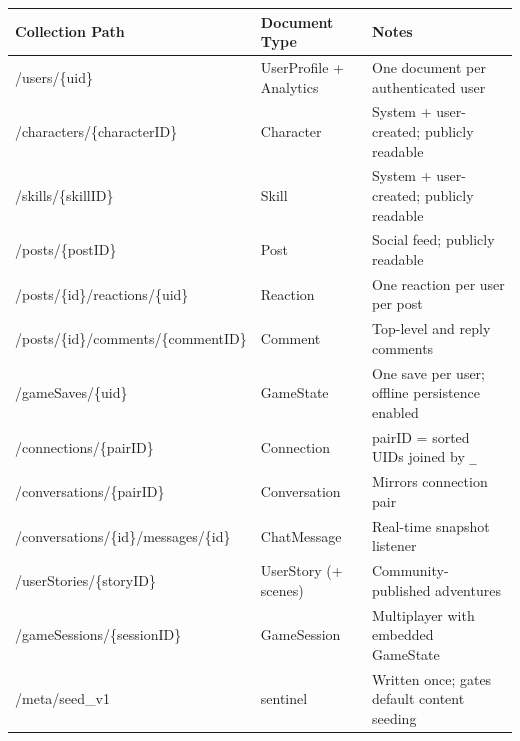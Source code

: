\documentclass[12pt,a4paper]{article}
\begin{document}
\begin{center}
\footnotesize
\begin{tabular}{>{\ttfamily\raggedright}p{5cm} >{\raggedright}p{3.8cm} >{\raggedright\arraybackslash}p{5.5cm}}
  \toprule
  \textbf{Collection Path} & \textbf{Document Type} & \textbf{Notes} \\
  \midrule
  /users/\{uid\}                         & UserProfile + Analytics     & One document per authenticated user \\
  /characters/\{characterID\}            & Character                   & System + user-created; publicly readable \\
  /skills/\{skillID\}                    & Skill                       & System + user-created; publicly readable \\
  /posts/\{postID\}                      & Post                        & Social feed; publicly readable \\
  /posts/\{id\}/reactions/\{uid\}        & Reaction                    & One reaction per user per post \\
  /posts/\{id\}/\allowbreak comments/\{commentID\}   & Comment                     & Top-level and reply comments \\
  /gameSaves/\{uid\}                     & GameState                   & One save per user; offline persistence enabled \\
  /connections/\{pairID\}                & Connection                  & pairID = sorted UIDs joined by \texttt{\_} \\
  /conversations/\{pairID\}              & Conversation                & Mirrors connection pair \\
  /conversations/\{id\}/\allowbreak messages/\{id\}  & ChatMessage                 & Real-time snapshot listener \\
  /userStories/\{storyID\}               & UserStory (+ scenes)        & Community-published adventures \\
  /gameSessions/\{sessionID\}            & GameSession                 & Multiplayer with embedded GameState \\
  /meta/seed\_v1                         & sentinel                    & Written once; gates default content seeding \\
  \bottomrule
\end{tabular}
\normalsize
\end{center}

\end{document}
